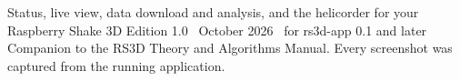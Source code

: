 \documentclass[a4paper,11pt,twoside,openright,headings=small,numbers=noenddot,parskip=half-]{scrbook}
\begin{document}
\frontmatter
{}%
  {Status, live view, data download and analysis, and the helicorder for your Raspberry Shake 3D}%
  {Edition 1.0 \textbullet\ October 2026 \textbullet\ for rs3d-app 0.1 and later}%
  {Companion to the RS3D Theory and Algorithms Manual. Every screenshot was captured from the running application.}

\tableofcontents
\mainmatter









\appendix



\backmatter
\printbibliography[heading=bibintoc,title={References}]
\end{document}
